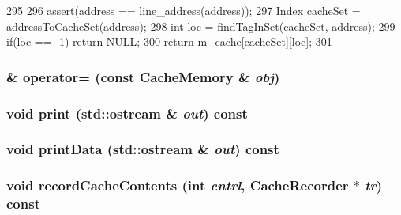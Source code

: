 \begin{DoxyCode}
295 {
296     assert(address == line_address(address));
297     Index cacheSet = addressToCacheSet(address);
298     int loc = findTagInSet(cacheSet, address);
299     if(loc == -1) return NULL;
300     return m_cache[cacheSet][loc];
301 }
\end{DoxyCode}
\hypertarget{classCacheMemory_a3ba0e3a7cc49aede911aa79977fc4128}{
\subsubsection[{operator=}]{\& operator= (const {\bf CacheMemory} \& {\em obj})}}
\label{classCacheMemory_a3ba0e3a7cc49aede911aa79977fc4128}
\hypertarget{classCacheMemory_ac55fe386a101fbae38c716067c9966a0}{
\subsubsection[{print}]{\setlength{\rightskip}{0pt plus 5cm}void print (std::ostream \& {\em out}) const}}
\label{classCacheMemory_ac55fe386a101fbae38c716067c9966a0}
\hypertarget{classCacheMemory_a82b5740a65950cb6ba001dc852567da7}{
\subsubsection[{printData}]{\setlength{\rightskip}{0pt plus 5cm}void printData (std::ostream \& {\em out}) const}}
\label{classCacheMemory_a82b5740a65950cb6ba001dc852567da7}
\hypertarget{classCacheMemory_aa6672e5328a3421c133ea5590f4b562d}{
\subsubsection[{recordCacheContents}]{\setlength{\rightskip}{0pt plus 5cm}void recordCacheContents (int {\em cntrl}, \/  {\bf CacheRecorder} $\ast$ {\em tr}) const}}
\label{classCacheMemory_aa6672e5328a3421c133ea5590f4b562d}



